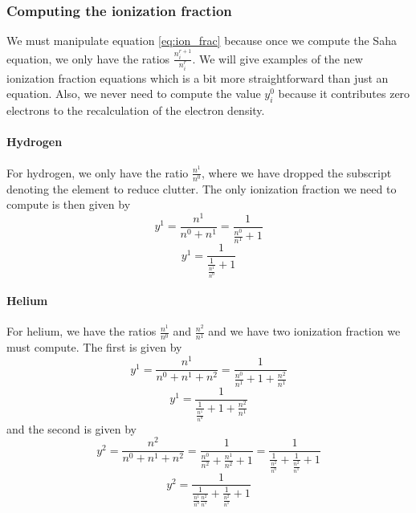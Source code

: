 \documentclass{article}
\begin{document}
			\subsubsection{Computing the ionization fraction}
				We must manipulate equation \ref{eq:ion_frac} because once we compute the Saha
				equation, we only have the ratios $\frac{n^{r+1}_i}{n^r_i}$. We will give examples
				of the new ionization fraction equations which is a bit more straightforward than
				just an equation. Also, we never need to compute the value $y^0_i$ because it 
				contributes zero electrons to the recalculation of the electron density.

				\paragraph{Hydrogen}
					For hydrogen, we only have the ratio $\frac{n^1}{n^0}$, where we have dropped
					the subscript denoting the element to reduce clutter. The only ionization 
					fraction we need to compute is then given by
					\begin{equation*} 
						y^1 = \frac{n^1}{n^0+n^1} = \frac{1}{\frac{n^0}{n^1}+1}
					\end{equation*}
					\begin{equation} 
						y^1 = \frac{1}{\frac{1}{\frac{n^1}{n^0}}+1}
					\end{equation}

				\paragraph{Helium} 
					For helium, we have the ratios $\frac{n^1}{n^0}$ and $\frac{n^2}{n^1}$ and 
					we have two ionization fraction we must compute. The first is given by
					\begin{equation*} 
						y^1 = \frac{n^1}{n^0+n^1+n^2} = 
							\frac{1}{\frac{n^0}{n^1}+1+\frac{n^2}{n^1}}
					\end{equation*}
					\begin{equation} 
						y^1 = \frac{1}{\frac{1}{\frac{n^1}{n^0}}+1+\frac{n^2}{n^1}}
					\end{equation}
					and the second is given by
					\begin{equation*} 
						y^2 = \frac{n^2}{n^0+n^1+n^2} = 
							\frac{1}{\frac{n^0}{n^2}+\frac{n^1}{n^2} + 1} =
							\frac{1}{\frac{1}{\frac{n^2}{n^0}} + \frac{1}{\frac{n^2}{n^1}} + 1}
					\end{equation*}
					\begin{equation} 
						y^2 = \frac{1}{\frac{1}{\frac{n^1}{n^0}\frac{n^2}{n^1}} + 
							\frac{1}{\frac{n^2}{n^1}} + 1}
					\end{equation}
				
\end{document}

